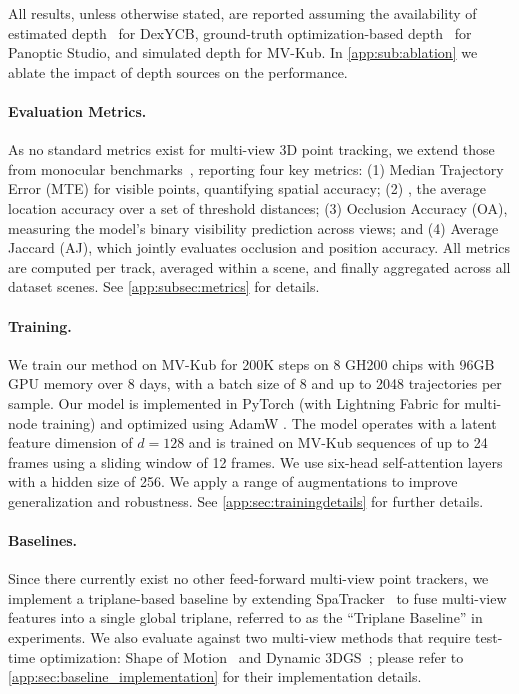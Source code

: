 \documentclass[10pt,twocolumn,letterpaper]{article}
\begin{document}
All results, unless otherwise stated, are reported assuming the availability of estimated depth~\cite{wang2024dust3r} for DexYCB, ground-truth optimization-based depth~\cite{luiten2023dynamic} for Panoptic Studio, and simulated depth for MV-Kub. In \cref{app:sub:ablation} we ablate the impact of depth sources on the performance. 



\paragraph{Evaluation Metrics.}
As no standard metrics exist for multi-view 3D point tracking, we extend those from monocular benchmarks~\cite{doersch2023tapvid}, reporting four key metrics: (1) Median Trajectory Error (MTE) for visible points, quantifying spatial accuracy; (2) \davg, the average location accuracy over a set of threshold distances; (3) Occlusion Accuracy (OA), measuring the model's binary visibility prediction across views; and (4) Average Jaccard (AJ), which jointly evaluates occlusion and position accuracy. All metrics are computed per track, averaged within a scene, and finally aggregated across all dataset scenes. See \cref{app:subsec:metrics} for details. 

\paragraph{Training.} 
We train our method on MV-Kub for 200K steps on 8 GH200 chips with 96GB GPU memory over 8 days, with a batch size of 8 and up to 2048 trajectories per sample. Our model is implemented in PyTorch (with Lightning Fabric for multi-node training) and optimized using AdamW \cite{loshchilov2017decoupled}. The model operates with a latent feature dimension of $d=128$ and is trained on MV-Kub sequences of up to 24 frames using a sliding window of 12 frames. We use six-head self-attention layers with a hidden size of 256. We apply a range of augmentations to improve generalization and robustness. See \cref{app:sec:trainingdetails} for further details. 

\paragraph{Baselines.}
Since there currently exist no other feed-forward multi-view point trackers, we implement a triplane-based baseline by extending SpaTracker~\cite{xiao2024spatialtracker} to fuse multi-view features into a single global triplane, referred to as the ``Triplane Baseline'' in experiments. 
We also evaluate against two multi-view methods that require test-time optimization: Shape of Motion~\cite{som2024} and Dynamic 3DGS~\cite{luiten2023dynamic}; please refer to \cref{app:sec:baseline_implementation} for their implementation details. 
\end{document}
